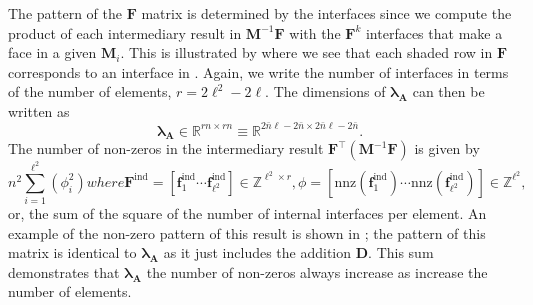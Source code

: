 %
%
%
The pattern of the $\textbf{F}$ matrix is determined by the interfaces since we compute the product of each intermediary result in $\textbf{M}^{-1} \textbf{F}$ with the $\textbf{F}^k$ interfaces that make a face in a given $\textbf{M}_i$. 
This is illustrated by  where we see that each shaded row in $\textbf{F}$ corresponds to an interface in .
Again, we write the number of interfaces in terms of the number of elements, $r = 2\ell^2 - 2\ell$. 
The dimensions of $\symbf{\lambda}_\textbf{A}$ can then be written as 
\begin{equation}
	\symbf{\lambda}_\textbf{A} \in \mathbb{R}^{rn \times rn} \equiv \mathbb{R}^{2\bar{n}\ell - 2\bar{n} \times 2\bar{n}\ell - 2\bar{n}}. 
	\label{eqn:lamsize}
\end{equation}
\noindent
The number of non-zeros in the intermediary result $\textbf{F}^{\intercal}(\textbf{M}^{-1}\textbf{F})$ is given by
\begin{subequations}
\begin{equation}
	n^2 \sum_{i=1}^{\ell^2} (\phi_i^2)
	\label{eqn:nz_sum}
\end{equation}
where
\begin{equation}
	\textbf{F}^{\text{ind}} = \left[\textbf{f}^{\text{ind}}_1 \cdots \textbf{f}^{\text{ind}}_{\ell^2}\right] \in \mathbb{Z}^{\ell^2 \times r},
\end{equation}
\begin{equation}
	\phi = \left[ \text{nnz}(\textbf{f}^{\text{ind}}_1) \cdots \text{nnz}(\textbf{f}^{\text{ind}}_{\ell^2}) \right] \in \mathbb{Z}^{\ell^2}, 
\end{equation}
\end{subequations}
or, the sum of the square of the number of internal interfaces per element. 
An example of the non-zero pattern of this result is shown in ; the pattern of this matrix is identical to $\symbf{\lambda}_\textbf{A}$ as it just includes the addition $\textbf{D}$.
This sum demonstrates that $\symbf{\lambda}_\textbf{A}$ the number of non-zeros always increase as increase the number of elements. 

